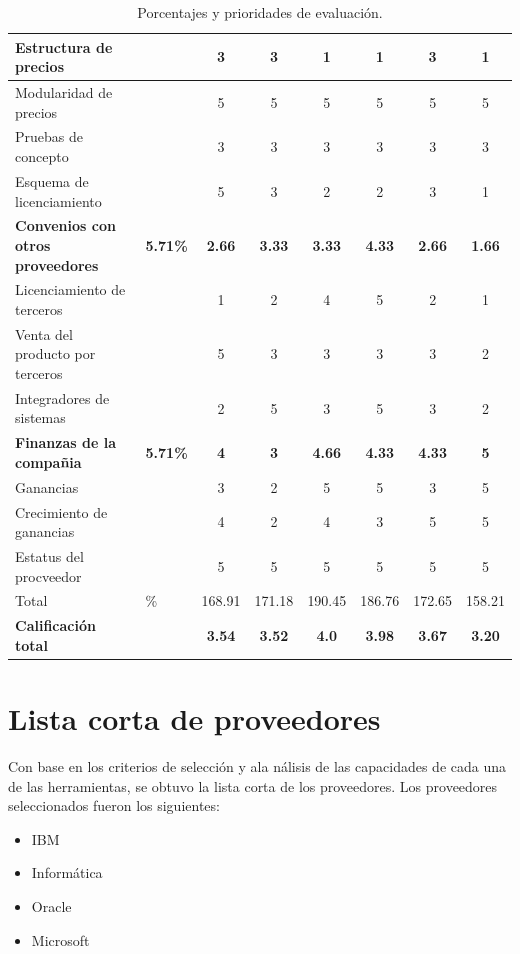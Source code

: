 \documentclass[a4paper,openright,12pt]{book}
\begin{document}
\begin{table}[htbp]
\begin{center}
{\begin{tabular}{|p{5.5cm}|>{\centering\arraybackslash}m{1.7cm}|c|c|c|c|c|c|}
\hline
Estructura de precios & & 3 & 3 & 1 & 1 & 3 & 1\\
\hline
Modularidad de precios & & 5 & 5 & 5 & 5 & 5 & 5\\
\hline
Pruebas de concepto & & 3 & 3 & 3 & 3 & 3 & 3\\
\hline
Esquema de licenciamiento & & 5 & 3 & 2 & 2 & 3 & 1\\
\hline
\rowcolor[gray]{0.9}\textbf{Convenios con otros proveedores} & \textbf{5.71\%} & \textbf{2.66} & \textbf{3.33} & \textbf{3.33} & \textbf{4.33} & \textbf{2.66} & \textbf{1.66}\\
\hline
Licenciamiento de terceros & & 1 & 2 & 4 & 5 & 2 & 1\\
\hline
Venta del producto por terceros & & 5 & 3 & 3 & 3 & 3 & 2\\
\hline
Integradores de sistemas & & 2 & 5 & 3 & 5 & 3 & 2\\
\hline
\rowcolor[gray]{0.9}\textbf{Finanzas de la compañia} & \textbf{5.71\%} & \textbf{4} & \textbf{3} & \textbf{4.66} & \textbf{4.33} & \textbf{4.33} & \textbf{5}\\
\hline
Ganancias & & 3 & 2 & 5 & 5 & 3 & 5\\
\hline
Crecimiento de ganancias & & 4 & 2 & 4 & 3 & 5 & 5\\
\hline
Estatus del procveedor & & 5 & 5 & 5 & 5 & 5 & 5\\
\hline
Total & 100.00\% & 168.91 & 171.18 & 190.45 & 186.76 & 172.65 & 158.21\\
\hline
\rowcolor[gray]{0.9}\textbf{Calificación total} & & \textbf{3.54} & \textbf{3.52} & \textbf{4.0} & \textbf{3.98} & \textbf{3.67} & \textbf{3.20}\\
\hline
\end{tabular}}
\caption{Porcentajes y prioridades de evaluación.}
\label{tabla:criterios}
\end{center}
\end{table}

\section{Lista corta de proveedores}
Con base en los criterios de selección y ala nálisis de las capacidades de cada una de las herramientas, se obtuvo la lista corta de los proveedores. Los proveedores seleccionados fueron los siguientes:

\begin{itemize}
\item IBM
\item Informática
\item Oracle
\item Microsoft
\end{itemize}
\end{document}
